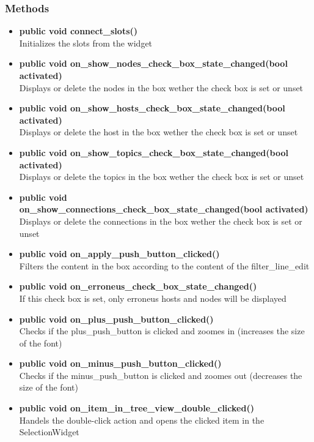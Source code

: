 \subsubsection{Methods}
\begin{itemize}
  \item \textbf{public void connect\_slots()}\\
  Initializes the slots from the widget
  \item \textbf{public void on\_show\_nodes\_check\_box\_state\_changed(bool activated)}\\
  Displays or delete the nodes in the box wether the check box is set or unset
  \item \textbf{public void on\_show\_hosts\_check\_box\_state\_changed(bool activated)}\\
  Displays or delete the host in the box wether the check box is set or unset
  \item \textbf{public void on\_show\_topics\_check\_box\_state\_changed(bool activated)}\\
  Displays or delete the topics in the box wether the check box is set or unset
  \item \textbf{public void
  on\_show\_connections\_check\_box\_state\_changed(bool activated)}\\
  Displays or delete the connections in the box wether the check box is set or
  unset
  \item \textbf{public void on\_apply\_push\_button\_clicked()}\\
  Filters the content in the box according to the content of the
  filter\_line\_edit
  \item \textbf{public void on\_erroneus\_check\_box\_state\_changed()}\\
  If this check box is set, only erroneus hosts and nodes will be displayed  
  \item \textbf{public void on\_plus\_push\_button\_clicked()}\\
  Checks if the plus\_push\_button is clicked and zoomes in (increases the size
  of the font)
  \item \textbf{public void on\_minus\_push\_button\_clicked()}\\
  Checks if the minus\_push\_button is clicked and zoomes out (decreases the
  size of the font)
  \item \textbf{public void on\_item\_in\_tree\_view\_double\_clicked()}\\
  Handels the double-click action and opens the clicked item in the SelectionWidget
\end{itemize}

